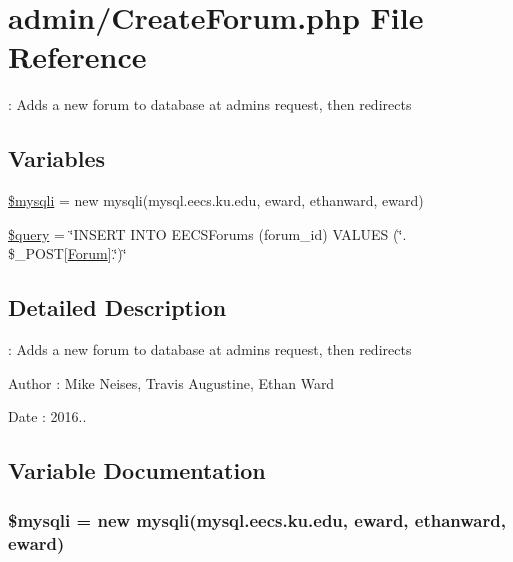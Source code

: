 \hypertarget{_create_forum_8php}{}\section{admin/\+Create\+Forum.php File Reference}
\label{_create_forum_8php}


\+: Adds a new forum to database at admin\textquotesingle{}s request, then redirects  


\subsection*{Variables}
\begin{DoxyCompactItemize}
\item 
\hyperlink{_create_forum_8php_a580989e8e3521433691a0351287f6315}{\$mysqli} = new mysqli(\textquotesingle{}mysql.\+eecs.\+ku.\+edu\textquotesingle{}, \textquotesingle{}eward\textquotesingle{}, \textquotesingle{}ethanward\textquotesingle{}, \textquotesingle{}eward\textquotesingle{})
\item 
\hyperlink{_create_forum_8php_af59a5f7cd609e592c41dc3643efd3c98}{\$query} = \char`\"{}I\+N\+S\+E\+RT I\+N\+TO E\+E\+C\+S\+Forums (forum\+\_\+id) V\+A\+L\+U\+ES (\textquotesingle{}\char`\"{}. \$\+\_\+\+P\+O\+ST\mbox{[}\textquotesingle{}\hyperlink{class_forum}{Forum}\textquotesingle{}\mbox{]}.\char`\"{}\textquotesingle{})\char`\"{}
\end{DoxyCompactItemize}


\subsection{Detailed Description}
\+: Adds a new forum to database at admin\textquotesingle{}s request, then redirects 

\begin{DoxyAuthor}{Author}
\+: Mike Neises, Travis Augustine, Ethan Ward 
\end{DoxyAuthor}
\begin{DoxyDate}{Date}
\+: 2016.. 
\end{DoxyDate}


\subsection{Variable Documentation}
\subsubsection[{\texorpdfstring{\$mysqli}{$mysqli}}]{\setlength{\rightskip}{0pt plus 5cm}\$mysqli = new mysqli(\textquotesingle{}mysql.\+eecs.\+ku.\+edu\textquotesingle{}, \textquotesingle{}eward\textquotesingle{}, \textquotesingle{}ethanward\textquotesingle{}, \textquotesingle{}eward\textquotesingle{})}\hypertarget{_create_forum_8php_a580989e8e3521433691a0351287f6315}{}\label{_create_forum_8php_a580989e8e3521433691a0351287f6315}
